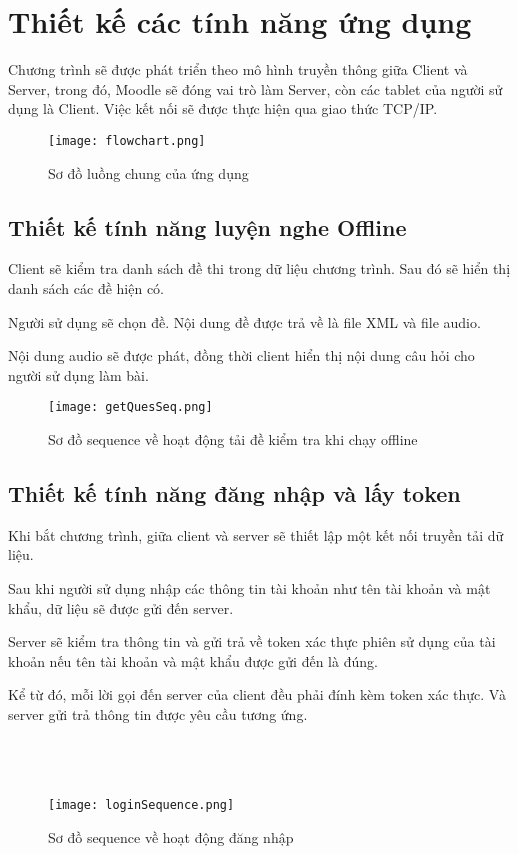 \section{Thiết kế các tính năng ứng dụng}
Chương trình sẽ được phát triển theo mô hình truyền thông giữa Client và Server, trong đó, Moodle sẽ đóng vai trò làm Server, còn các tablet của người sử dụng là Client. Việc kết nối sẽ được thực hiện qua giao thức TCP/IP.
\newpage
\begin{figure}[!htb] 
\centering
\texttt{[image: flowchart.png]}
\caption{Sơ đồ luồng chung của ứng dụng}
\end{figure}


\subsection{Thiết kế tính năng luyện nghe Offline}
Client sẽ kiểm tra danh sách đề thi trong dữ liệu chương trình. Sau đó sẽ hiển thị danh sách các đề hiện có.

Người sử dụng sẽ chọn đề. Nội dung đề được trả về là file XML và file audio.

Nội dung audio sẽ được phát, đồng thời client hiển thị nội dung câu hỏi cho người sử dụng làm bài.

\begin{figure}[!htb] 
\centering
\texttt{[image: getQuesSeq.png]}
\caption{Sơ đồ sequence về hoạt động tải đề kiểm tra khi chạy offline}
\end{figure}

\subsection{Thiết kế tính năng đăng nhập và lấy token}

Khi bắt chương trình, giữa client và server sẽ thiết lập một kết nối truyền tải dữ liệu.

Sau khi người sử dụng nhập các thông tin tài khoản như tên tài khoản và mật khẩu, dữ liệu sẽ được gửi đến server.

Server sẽ kiểm tra thông tin và gửi trả về token xác thực phiên sử dụng của tài khoản nếu tên tài khoản và mật khẩu được gửi đến là đúng.

Kể từ đó, mỗi lời gọi đến server của client đều phải đính kèm token xác thực. Và server gửi trả thông tin được yêu cầu tương ứng.\\
\\
\\
\\
\begin{figure}[!htb] 
\centering
\texttt{[image: loginSequence.png]}
\caption{Sơ đồ sequence về hoạt động đăng nhập}
\end{figure}
\\

